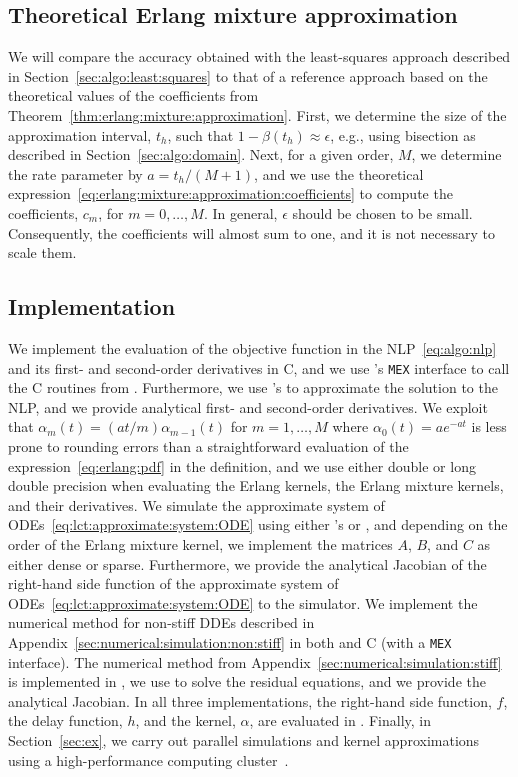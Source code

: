 \subsection{Theoretical Erlang mixture approximation}\label{sec:algo:theoretical:approximation}
We will compare the accuracy obtained with the least-squares approach described in Section~\ref{sec:algo:least:squares} to that of a reference approach based on the theoretical values of the coefficients from Theorem~\ref{thm:erlang:mixture:approximation}. First, we determine the size of the approximation interval, $t_h$, such that $1 - \beta(t_h) \approx \epsilon$, e.g., using bisection as described in Section~\ref{sec:algo:domain}. Next, for a given order, $M$, we determine the rate parameter by $a = t_h/(M+1)$, and we use the theoretical expression~\eqref{eq:erlang:mixture:approximation:coefficients} to compute the coefficients, $c_m$, for $m = 0, \ldots, M$. In general, $\epsilon$ should be chosen to be small. Consequently, the coefficients will almost sum to one, and it is not necessary to scale them.

\subsection{Implementation}\label{sec:algo:implementation}
We implement the evaluation of the objective function in the NLP~\eqref{eq:algo:nlp} and its first- and second-order derivatives in C, and we use \matlab{}'s \texttt{MEX} interface to call the C routines from \matlab{}. Furthermore, we use \matlab{}'s \fmincon{} to approximate the solution to the NLP, and we provide analytical first- and second-order derivatives. We exploit that $\alpha_m(t) = (at/m) \alpha_{m-1}(t)$ for $m = 1, \ldots, M$ where $\alpha_0(t) = a e^{-at}$ is less prone to rounding errors than a straightforward evaluation of the expression~\eqref{eq:erlang:pdf} in the definition, and we use either double or long double precision when evaluating the Erlang kernels, the Erlang mixture kernels, and their derivatives.
%
We simulate the approximate system of ODEs~\eqref{eq:lct:approximate:system:ODE} using either \matlab{}'s \odeff{} or \odeofs, and depending on the order of the Erlang mixture kernel, we implement the matrices $A$, $B$, and $C$ as either dense or sparse. Furthermore, we provide the analytical Jacobian of the right-hand side function of the approximate system of ODEs~\eqref{eq:lct:approximate:system:ODE} to the simulator.
%
We implement the numerical method for non-stiff DDEs described in Appendix~\ref{sec:numerical:simulation:non:stiff} in both \matlab{} and C (with a \texttt{MEX} interface). The numerical method from Appendix~\ref{sec:numerical:simulation:stiff} is implemented in \matlab{}, we use \fsolve{} to solve the residual equations, and we provide the analytical Jacobian.  In all three implementations, the right-hand side function, $f$, the delay function, $h$, and the kernel, $\alpha$, are evaluated in \matlab{}. Finally, in Section~\ref{sec:ex}, we carry out parallel simulations and kernel approximations using a high-performance computing cluster~\cite{DTU:DCC:Resource}.
